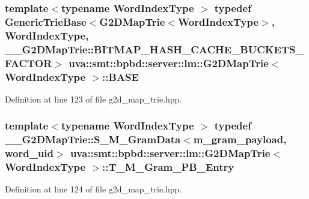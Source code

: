 \subsubsection[{B\+A\+S\+E}]{\setlength{\rightskip}{0pt plus 5cm}template$<$typename Word\+Index\+Type $>$ typedef {\bf Generic\+Trie\+Base}$<${\bf G2\+D\+Map\+Trie}$<${\bf Word\+Index\+Type}$>$, {\bf Word\+Index\+Type}, \+\_\+\+\_\+\+G2\+D\+Map\+Trie\+::\+B\+I\+T\+M\+A\+P\+\_\+\+H\+A\+S\+H\+\_\+\+C\+A\+C\+H\+E\+\_\+\+B\+U\+C\+K\+E\+T\+S\+\_\+\+F\+A\+C\+T\+O\+R$>$ {\bf uva\+::smt\+::bpbd\+::server\+::lm\+::\+G2\+D\+Map\+Trie}$<$ {\bf Word\+Index\+Type} $>$\+::{\bf B\+A\+S\+E}}\label{classuva_1_1smt_1_1bpbd_1_1server_1_1lm_1_1_g2_d_map_trie_a68a1f3a5cfa63607571c8e7a4261122f}


Definition at line 123 of file g2d\+\_\+map\+\_\+trie.\+hpp.

\hypertarget{classuva_1_1smt_1_1bpbd_1_1server_1_1lm_1_1_g2_d_map_trie_a26c51a5556b8312e561acafa825aee31}{}
\subsubsection[{T\+\_\+\+M\+\_\+\+Gram\+\_\+\+P\+B\+\_\+\+Entry}]{\setlength{\rightskip}{0pt plus 5cm}template$<$typename Word\+Index\+Type $>$ typedef {\bf \+\_\+\+\_\+\+G2\+D\+Map\+Trie\+::\+S\+\_\+\+M\+\_\+\+Gram\+Data}$<${\bf m\+\_\+gram\+\_\+payload}, {\bf word\+\_\+uid}$>$ {\bf uva\+::smt\+::bpbd\+::server\+::lm\+::\+G2\+D\+Map\+Trie}$<$ {\bf Word\+Index\+Type} $>$\+::{\bf T\+\_\+\+M\+\_\+\+Gram\+\_\+\+P\+B\+\_\+\+Entry}}\label{classuva_1_1smt_1_1bpbd_1_1server_1_1lm_1_1_g2_d_map_trie_a26c51a5556b8312e561acafa825aee31}


Definition at line 124 of file g2d\+\_\+map\+\_\+trie.\+hpp.

\hypertarget{classuva_1_1smt_1_1bpbd_1_1server_1_1lm_1_1_g2_d_map_trie_abaad3a9ae2c2373d42e966e841bfede7}{}
